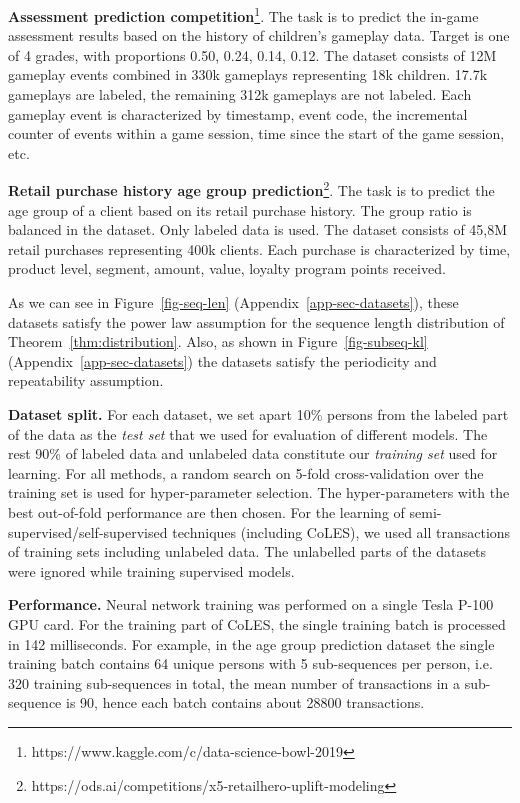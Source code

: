 \documentclass[sigconf]{acmart}
\begin{document}
\textbf{Assessment prediction competition}\footnote{https://www.kaggle.com/c/data-science-bowl-2019}. The task is to predict the in-game assessment results based on the history of children's gameplay data. Target is one of 4 grades, with proportions 0.50, 0.24, 0.14, 0.12. The dataset consists of 12M gameplay events combined in 330k gameplays representing 18k children. 17.7k gameplays are labeled, the remaining 312k gameplays are not labeled. Each gameplay event is characterized by timestamp, event code, the incremental counter of events within a game session, time since the start of the game session, etc.

\textbf{Retail purchase history age group prediction}\footnote{https://ods.ai/competitions/x5-retailhero-uplift-modeling}. The task is to predict the age group of a client based on its retail purchase history. The group ratio is balanced in the dataset. Only labeled data is used. The dataset consists of 45,8M retail purchases representing 400k clients. Each purchase is characterized by time, product level, segment, amount, value, loyalty program points received.

As we can see in Figure~\ref{fig-seq-len} (Appendix~\ref{app-sec-datasets}), these datasets satisfy the power law assumption for the sequence length distribution of Theorem~\ref{thm:distribution}. Also, as shown in Figure~\ref{fig-subseq-kl} (Appendix~\ref{app-sec-datasets}) the datasets satisfy the periodicity and repeatability assumption.


\textbf{Dataset split.} For each dataset, we set apart 10\% persons from the labeled part of the data as the \textit{test set} that we used for evaluation of different models. The rest 90\% of labeled data and unlabeled data constitute our \textit{training set} used for learning. For all methods, a random search on 5-fold cross-validation over the training set is used for hyper-parameter selection. The hyper-parameters with the best out-of-fold performance are then chosen.
For the learning of semi-supervised/self-supervised techniques (including CoLES), we used all transactions of training sets including unlabeled data. The unlabelled parts of the datasets were ignored while training supervised models.

\textbf{Performance.} Neural network training was performed on a single Tesla P-100 GPU card. For the training part of CoLES, the single training batch is processed in 142 milliseconds. For example, in the age group prediction dataset the single training batch contains 64 unique persons with 5 sub-sequences per person, i.e. 320 training sub-sequences in total, the mean number of transactions in a sub-sequence is 90, hence each batch contains about 28800 transactions.
\end{document}
